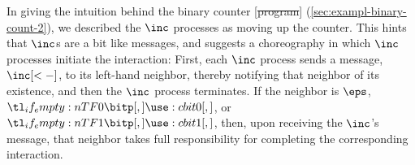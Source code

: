 In giving the intuition behind the binary counter [\st{program}] (\cref{sec:exampl-binary-count-2}), we described the $\inc$ processes %
as moving up the counter.
This hints that $\inc$s are a bit like messages, and suggests a choreography in which $\inc$ processes initiate the interaction:
First, each $\inc$ process sends a message, $\inc[<-]$, to its left-hand neighbor, thereby notifying that neighbor of its existence, and then the $\inc$ process terminates.
If the neighbor is $\eps$, $\bit{0}$, or $\bit{1}$, then, upon receiving the $\inc$'s message, that neighbor takes full responsibility for completing the corresponding interaction.


